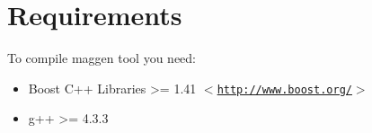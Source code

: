 \hypertarget{index_requirements}{}
\section{Requirements}\label{index_requirements}
To compile maggen tool you need:
\begin{itemize}
\item Boost C++ Libraries >= 1.41 $<$\href{http://www.boost.org/}{\tt http://www.boost.org/}$>$
\item g++ >= 4.3.3
\end{itemize}

\par
\par
 